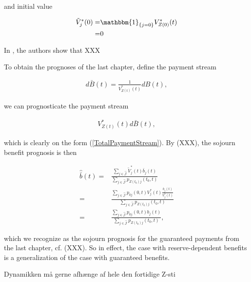 \documentclass{book}
\newcommand{\1}[1]{\mathbbm{1}_{\left\lbrace #1 \right\rbrace}}
\theoremstyle{break}
\theoremstyle{remark}
\newenvironment{remark}
  {\pushQED{\qed}\renewcommand{\qedsymbol}{\scalebox{1.4}{$\circ$}}\remarkx}
  {\popQED\endremarkx}
\numberwithin{equation}{section}
\begin{document}
\begin{remark}
	and initial value
	
	\begin{align*}
	\tilde{V}_j^*(0) =& \1{j=0} V_{Z(0)}^*(t) \\
	=& 0
	\end{align*}

	In \cite{Lollike}, the authors show that XXX

	To obtain the prognoses of the last chapter, define the payment stream
	
	\begin{align*}
		d\bar{B}(t) = \frac{1}{V_{Z(t)}^*(t)}dB(t),
	\end{align*}

	we can prognosticate the payment stream
	
	\begin{align*}
	V_{Z(t)}^*(t) d\bar{B}(t),
	\end{align*}
	
	which is clearly on the form (\ref{TotalPaymentStream}). By (XXX), the sojourn benefit prognosis is then
	
	\begin{align*}
	\hat{\bar{b}}(t) =& \frac{\sum_{j \in \hat{\mathcal{J}}} \tilde{V}_j^*(t) \bar{b}_j(t)}{\sum_{j \in \hat{\mathcal{J}}} p_{Z(t_0)j}(t_0,t)} \\
	=& \frac{\sum_{j \in \hat{\mathcal{J}}} p_{0j}(0,t) V_j^*(t) \frac{b_j(t)}{V_j^*(t)}}{\sum_{j \in \hat{\mathcal{J}}} p_{Z(t_0)j}(t_0,t)} \\
	=& \frac{\sum_{j \in \hat{\mathcal{J}}} p_{0j}(0,t) b_j(t)}{\sum_{j \in \hat{\mathcal{J}}} p_{Z(t_0)j}(t_0,t)},
	\end{align*}

	which we recognize as the sojourn prognosis for the guaranteed payments from the last chapter, cf. (XXX). So in effect, the case with reserve-dependent benefits is a generalization of the case with guaranteed benefits.
\end{remark}

\begin{remark}
	Dynamikken må gerne afhænge af hele den fortidige Z-sti
\end{remark}
\end{document}
